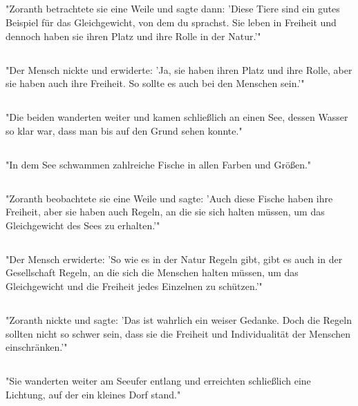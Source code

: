 \documentclass{article}
\begin{document}
\subsection{}
"Zoranth betrachtete sie eine Weile und sagte dann: 'Diese Tiere sind ein gutes Beispiel für das Gleichgewicht, von dem du sprachst. Sie leben in Freiheit und dennoch haben sie ihren Platz und ihre Rolle in der Natur.'"
\subsection{}
"Der Mensch nickte und erwiderte: 'Ja, sie haben ihren Platz und ihre Rolle, aber sie haben auch ihre Freiheit. So sollte es auch bei den Menschen sein.'"
\subsection{}
"Die beiden wanderten weiter und kamen schließlich an einen See, dessen Wasser so klar war, dass man bis auf den Grund sehen konnte."
\subsection{}
"In dem See schwammen zahlreiche Fische in allen Farben und Größen."
\subsection{}
"Zoranth beobachtete sie eine Weile und sagte: 'Auch diese Fische haben ihre Freiheit, aber sie haben auch Regeln, an die sie sich halten müssen, um das Gleichgewicht des Sees zu erhalten.'"
\subsection{}
"Der Mensch erwiderte: 'So wie es in der Natur Regeln gibt, gibt es auch in der Gesellschaft Regeln, an die sich die Menschen halten müssen, um das Gleichgewicht und die Freiheit jedes Einzelnen zu schützen.'"
\subsection{}
"Zoranth nickte und sagte: 'Das ist wahrlich ein weiser Gedanke. Doch die Regeln sollten nicht so schwer sein, dass sie die Freiheit und Individualität der Menschen einschränken.'"
\subsection{}
"Sie wanderten weiter am Seeufer entlang und erreichten schließlich eine Lichtung, auf der ein kleines Dorf stand."
\end{document}
